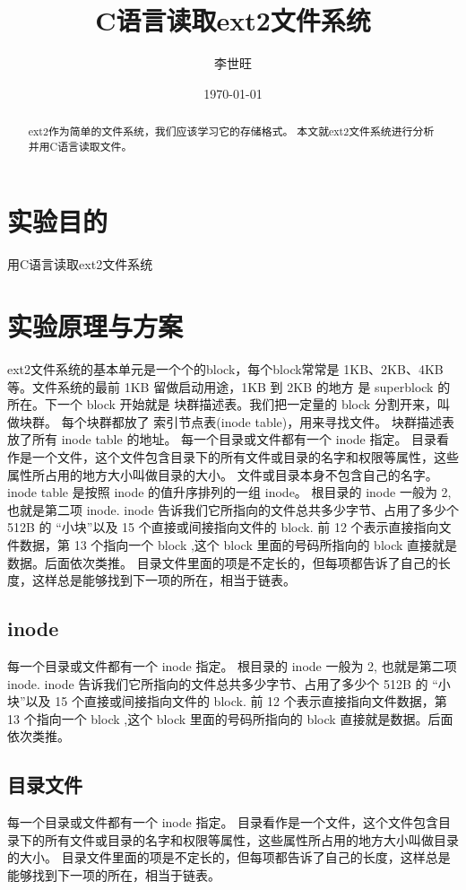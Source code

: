 \documentclass[UTF8]{ctexart}
\title{C语言读取ext2文件系统}
\author{李世旺}
\date{\today}
\begin{document}
\maketitle
\begin{abstract}
ext2作为简单的文件系统，我们应该学习它的存储格式。
本文就ext2文件系统进行分析并用C语言读取文件。
\end{abstract}
\newpage

\tableofcontents
\newpage
\section{实验目的}
用C语言读取ext2文件系统
\section{实验原理与方案}
ext2文件系统的基本单元是一个个的block，每个block常常是 1KB、2KB、4KB等。文件系统的最前 1KB 留做启动用途，1KB 到 2KB 的地方
是 superblock 的所在。下一个 block 开始就是 块群描述表。我们把一定量的 block 分割开来，叫做块群。
每个块群都放了 索引节点表(inode table)，用来寻找文件。
块群描述表 放了所有 inode table 的地址。
每一个目录或文件都有一个 inode 指定。
目录看作是一个文件，这个文件包含目录下的所有文件或目录的名字和权限等属性，这些属性所占用的地方大小叫做目录的大小。
文件或目录本身不包含自己的名字。
inode table 是按照 inode 的值升序排列的一组 inode。
根目录的 inode 一般为 2, 也就是第二项 inode.
inode 告诉我们它所指向的文件总共多少字节、占用了多少个 512B 的 “小块”以及 15 个直接或间接指向文件的 block.
前 12 个表示直接指向文件数据，第 13 个指向一个 block ,这个 block 里面的号码所指向的 block 直接就是数据。后面依次类推。
目录文件里面的项是不定长的，但每项都告诉了自己的长度，这样总是能够找到下一项的所在，相当于链表。
\subsection{inode}
每一个目录或文件都有一个 inode 指定。
根目录的 inode 一般为 2, 也就是第二项 inode.
inode 告诉我们它所指向的文件总共多少字节、占用了多少个 512B 的 “小块”以及 15 个直接或间接指向文件的 block.
前 12 个表示直接指向文件数据，第 13 个指向一个 block ,这个 block 里面的号码所指向的 block 直接就是数据。后面依次类推。
\subsection{目录文件}
每一个目录或文件都有一个 inode 指定。
目录看作是一个文件，这个文件包含目录下的所有文件或目录的名字和权限等属性，这些属性所占用的地方大小叫做目录的大小。
目录文件里面的项是不定长的，但每项都告诉了自己的长度，这样总是能够找到下一项的所在，相当于链表。
\end{document}
